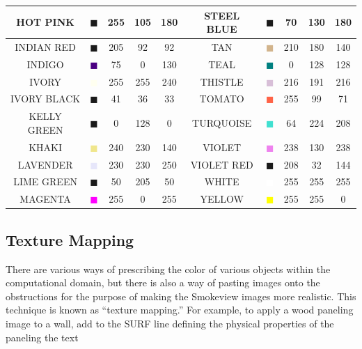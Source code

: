 \documentclass[11pt]{book}
\begin{document}
\begin{table}[p]
\begin{center}
\begin{tabular}{|c|c|c|c|c|c||c|c|c|c|}
{\ct HOT PINK} & \textcolor{HOT PINK} {$\blacksquare$} & 255& 105& 180& {\ct STEEL BLUE} &  \textcolor{STEEL BLUE} {$\blacksquare$} & 70& 130& 180  \\ \hline
{\ct INDIAN RED} & \textcolor{INDIAN RED} {$\blacksquare$} & 205& 92& 92& {\ct TAN} &  \textcolor{TAN} {$\blacksquare$} & 210& 180& 140  \\ \hline
{\ct INDIGO} & \textcolor{INDIGO} {$\blacksquare$} & 75& 0& 130& {\ct TEAL} &  \textcolor{TEAL} {$\blacksquare$} & 0& 128& 128  \\ \hline
{\ct IVORY} & \textcolor{IVORY} {$\blacksquare$} & 255& 255& 240& {\ct THISTLE} &  \textcolor{THISTLE} {$\blacksquare$} & 216& 191& 216  \\ \hline
{\ct IVORY BLACK} & \textcolor{IVORY BLACK} {$\blacksquare$} & 41& 36& 33& {\ct TOMATO } &  \textcolor{TOMATO } {$\blacksquare$} & 255& 99& 71  \\ \hline
{\ct KELLY GREEN} & \textcolor{KELLY GREEN} {$\blacksquare$} & 0& 128& 0& {\ct TURQUOISE} &  \textcolor{TURQUOISE} {$\blacksquare$} & 64& 224& 208  \\ \hline
{\ct KHAKI} & \textcolor{KHAKI} {$\blacksquare$} & 240& 230& 140& {\ct VIOLET} &  \textcolor{VIOLET} {$\blacksquare$} & 238& 130& 238  \\ \hline
{\ct LAVENDER} & \textcolor{LAVENDER} {$\blacksquare$} & 230& 230& 250& {\ct VIOLET RED} &  \textcolor{VIOLET RED} {$\blacksquare$} & 208& 32& 144  \\ \hline
{\ct LIME GREEN} & \textcolor{LIME GREEN} {$\blacksquare$} & 50& 205& 50& {\ct WHITE} &  \textcolor{WHITE} {$\blacksquare$} & 255& 255& 255  \\ \hline
{\ct MAGENTA} & \textcolor{MAGENTA} {$\blacksquare$} & 255& 0& 255& {\ct YELLOW} &  \textcolor{YELLOW} {$\blacksquare$} & 255& 255& 0  \\ \hline
\hline
\end{tabular}
\end{center}
\end{table}


\subsection{Texture Mapping}%

There are various ways of prescribing the color of various objects
within the computational domain, but there is also a way of pasting
images onto the obstructions for the purpose of making the Smokeview
images more realistic. This technique is known as ``texture mapping.''
For example, to apply a wood paneling image to a wall,
add to the {\ct SURF} line defining the physical properties of the
paneling the text
\end{document}
